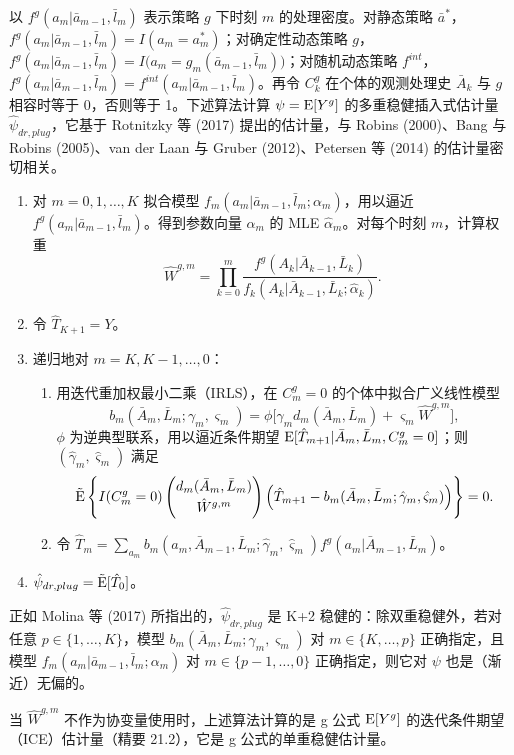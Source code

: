 \begin{techpoint}[多重稳健估计量]
以 $f^g(a_m|\bar a_{m-1},\bar l_m)$ 表示策略 $g$ 下时刻 $m$ 的处理密度。对静态策略 $\bar a^*$，$f^g(a_m|\bar a_{m-1},\bar l_m)=I(a_m=a_m^*)$；对确定性动态策略 $g$，$f^g(a_m|\bar a_{m-1},\bar l_m)=I\big(a_m=g_m(\bar a_{m-1},\bar l_m)\big)$；对随机动态策略 $f^{int}$，$f^g(a_m|\bar a_{m-1},\bar l_m)=f^{int}(a_m|\bar a_{m-1},\bar l_m)$。再令 $C^g_k$ 在个体的观测处理史 $\bar A_k$ 与 $g$ 相容时等于 0，否则等于 1。下述算法计算 $\psi=\mathrm{E}[Y^g]$ 的多重稳健插入式估计量 $\hat\psi_{dr,plug}$，它基于 Rotnitzky 等 (2017) 提出的估计量，与 Robins (2000)、Bang 与 Robins (2005)、van der Laan 与 Gruber (2012)、Petersen 等 (2014) 的估计量密切相关。

\begin{enumerate}[label=\arabic*.,leftmargin=1.9em]
\item 对 $m=0,1,\dots,K$ 拟合模型 $f_m(a_m|\bar a_{m-1},\bar l_m;\alpha_m)$，用以逼近 $f^g(a_m|\bar a_{m-1},\bar l_m)$。得到参数向量 $\alpha_m$ 的 MLE $\hat\alpha_m$。对每个时刻 $m$，计算权重
\[
\hat W^{g,m}=\prod_{k=0}^{m}\frac{f^g(A_k|\bar A_{k-1},\bar L_k)}{f_k(A_k|\bar A_{k-1},\bar L_k;\hat\alpha_k)}.
\]
\item 令 $\hat T_{K+1}=Y$。
\item 递归地对 $m=K,K-1,\dots,0$：
\begin{enumerate}[label=(\alph*),leftmargin=1.7em]
\item 用迭代重加权最小二乘（IRLS），在 $C^g_m=0$ 的个体中拟合广义线性模型
\[
b_m(\bar A_m,\bar L_m;\gamma_m,\varsigma_m)=\phi\big[\gamma_md_m(\bar A_m,\bar L_m)+\varsigma_m\hat W^{g,m}\big],
\]
$\phi$ 为逆典型联系，用以逼近条件期望 $\mathrm{E}[\hat T_{m+1}|\bar A_m,\bar L_m,C^g_m=0]$；则 $(\hat\gamma_m,\hat\varsigma_m)$ 满足
\[
\tilde{\mathrm{E}}\left\{I(C^g_m=0)\begin{pmatrix}d_m(\bar A_m,\bar L_m)\\[2pt] \hat W^{g,m}\end{pmatrix}\Big(\hat T_{m+1}-b_m(\bar A_m,\bar L_m;\hat\gamma_m,\hat\varsigma_m)\Big)\right\}=0.
\]
\item 令 $\hat T_m=\sum_{a_m}b_m(a_m,\bar A_{m-1},\bar L_m;\hat\gamma_m,\hat\varsigma_m)f^g(a_m|\bar A_{m-1},\bar L_m)$。
\end{enumerate}
\item $\hat\psi_{dr,plug}=\tilde{\mathrm{E}}[\hat T_0]$。
\end{enumerate}

正如 Molina 等 (2017) 所指出的，$\hat\psi_{dr,plug}$ 是 K+2 稳健的：除双重稳健外，若对任意 $p\in\{1,\dots,K\}$，模型 $b_m(\bar A_m,\bar L_m;\gamma_m,\varsigma_m)$ 对 $m\in\{K,\dots,p\}$ 正确指定，且模型 $f_m(a_m|\bar a_{m-1},\bar l_m;\alpha_m)$ 对 $m\in\{p-1,\dots,0\}$ 正确指定，则它对 $\psi$ 也是（渐近）无偏的。

当 $\hat W^{g,m}$ 不作为协变量使用时，上述算法计算的是 g 公式 $\mathrm{E}[Y^g]$ 的迭代条件期望（ICE）估计量（精要 21.2），它是 g 公式的单重稳健估计量。
\end{techpoint}

